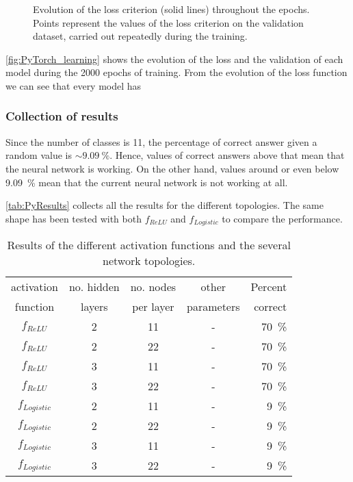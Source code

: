 \begin{figure}[htbp]
	\centering
	
	\caption{Evolution of the loss criterion (solid lines) throughout the epochs.
		Points represent the values of the loss criterion on the validation dataset, carried out repeatedly during the training.
	}
	\label{fig:PyTorch_learning}
\end{figure}

\autoref{fig:PyTorch_learning} shows the evolution of the loss and the validation of each model during the \num{2000} epochs of training.
From the evolution of the loss function we can see that every model has 


\subsubsection{Collection of results}
Since the number of classes is \num{11}, the percentage of correct answer given a random value is $\sim \SI{9.09}{\percent}$.
Hence, values of correct answers above that mean that the neural network is working.
On the other hand, values around or even below \SI{9.09}{\percent} mean that the current neural network is not working at all.

\autoref{tab:PyResults} collects all the results for the different topologies.
The same shape has been tested with both $f_{ReLU}$ and $f_{Logistic}$ to compare the performance.

\begin{table}[htbp]
	\centering
	\begin{tabular}{c c c c r}
	\toprule
	activation	& no. hidden 	& no. nodes	& other			& Percent\\
	function		& layers 			& per layer	& parameters	& correct\\
	\midrule
	$f_{ReLU}$ 			& 2 & 11 & - & \SI{70}{\percent}\\
	$f_{ReLU}$ 			& 2 & 22 & - & \SI{70}{\percent}\\
	$f_{ReLU}$ 			& 3 & 11 & - & \SI{70}{\percent}\\
	$f_{ReLU}$ 			& 3 & 22 & - & \SI{70}{\percent}\\
	$f_{Logistic}$ 	& 2 & 11 & - & \SI{9}{\percent}\\
	$f_{Logistic}$ 	& 2 & 22 & - & \SI{9}{\percent}\\
	$f_{Logistic}$ 	& 3 & 11 & - & \SI{9}{\percent}\\
	$f_{Logistic}$ 	& 3 & 22 & - & \SI{9}{\percent}\\
	\bottomrule
	\end{tabular}
	\caption{Results of the different activation functions and the several network topologies.
	}
	\label{tab:PyResults}
\end{table}


